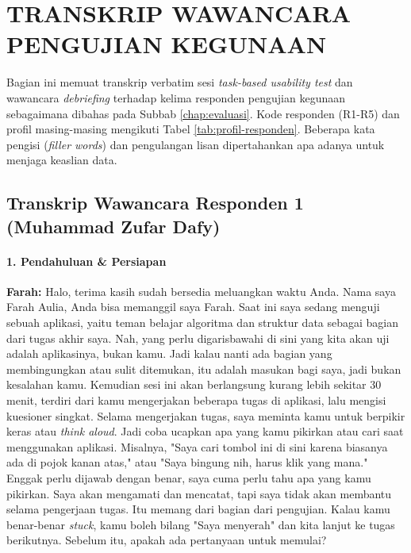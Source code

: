 \cleardoublepage
\chapter{TRANSKRIP WAWANCARA PENGUJIAN KEGUNAAN}
\label{chap:lampiran-b}

Bagian ini memuat transkrip verbatim sesi \textit{task-based usability test} dan wawancara \textit{debriefing} terhadap kelima responden pengujian kegunaan sebagaimana dibahas pada Subbab \ref{chap:evaluasi}. Kode responden (R1-R5) dan profil masing-masing mengikuti Tabel \ref{tab:profil-responden}. Beberapa kata pengisi (\textit{filler words}) dan pengulangan lisan dipertahankan apa adanya untuk menjaga keaslian data.

\section{Transkrip Wawancara Responden 1 (Muhammad Zufar Dafy)}

\subsubsection*{1. Pendahuluan \& Persiapan}

\textbf{Farah:} Halo, terima kasih sudah bersedia meluangkan waktu Anda. Nama saya Farah Aulia, Anda bisa memanggil saya Farah. Saat ini saya sedang menguji sebuah aplikasi, yaitu teman belajar algoritma dan struktur data sebagai bagian dari tugas akhir saya. Nah, yang perlu digarisbawahi di sini yang kita akan uji adalah aplikasinya, bukan kamu. Jadi kalau nanti ada bagian yang membingungkan atau sulit ditemukan, itu adalah masukan bagi saya, jadi bukan kesalahan kamu. Kemudian sesi ini akan berlangsung kurang lebih sekitar 30 menit, terdiri dari kamu mengerjakan beberapa tugas di aplikasi, lalu mengisi kuesioner singkat. Selama mengerjakan tugas, saya meminta kamu untuk berpikir keras atau \textit{think aloud}. Jadi coba ucapkan apa yang kamu pikirkan atau cari saat menggunakan aplikasi. Misalnya, "Saya cari tombol ini di sini karena biasanya ada di pojok kanan atas," atau "Saya bingung nih, harus klik yang mana." Enggak perlu dijawab dengan benar, saya cuma perlu tahu apa yang kamu pikirkan. Saya akan mengamati dan mencatat, tapi saya tidak akan membantu selama pengerjaan tugas. Itu memang dari bagian dari pengujian. Kalau kamu benar-benar \textit{stuck}, kamu boleh bilang "Saya menyerah" dan kita lanjut ke tugas berikutnya. Sebelum itu, apakah ada pertanyaan untuk memulai?


